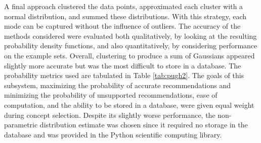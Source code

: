 \documentclass[11pt]{article} %
\begin{document}
\newline \quad \newline
A final approach clustered the data points, approximated each cluster with a normal distribution, and summed these distributions. With this strategy, each mode can be captured without the influence of outliers. The accuracy of the methods considered were evaluated both qualitatively, by looking at the resulting probability density functions, and also quantitatively, by considering performance on the example sets. Overall, clustering to produce a sum of Gaussians appeared slightly more accurate but was the most difficult to store in a database. The probability metrics used are tabulated in Table \ref{tab:pugh2}. The goals of this subsystem, maximizing the probability of accurate recommendations and minimizing the probability of unsupported recommendations, ease of computation, and the ability to be stored in a database, were given equal weight during concept selection. Despite its slightly worse performance, the non-parametric distribution estimate was chosen since it required no storage in the database and was provided in the Python scientific computing library.
\end{document}
